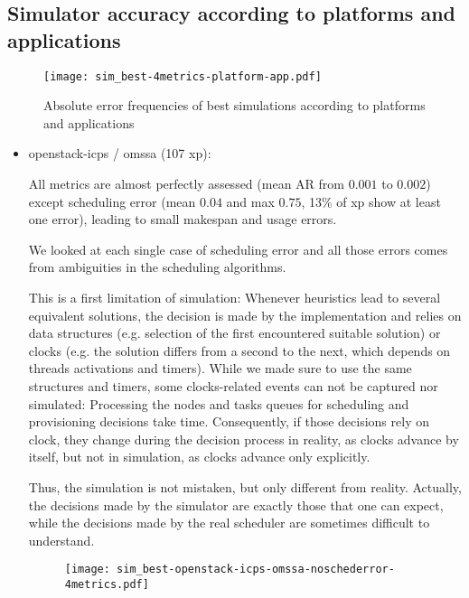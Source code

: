\subsection{Simulator accuracy according to platforms and applications}


\begin{figure}
  \texttt{[image: sim\_best-4metrics-platform-app.pdf]}
\caption{Absolute error frequencies of best simulations according to platforms 
and applications}
\end{figure} 

\begin{itemize}
 \item openstack-icps / omssa (107 xp): 
 
      
 
      All metrics are almost perfectly assessed (mean AR from $0.001$ to $0.002$)
      except scheduling error 
      (mean $0.04$ and max $0.75$, 13\% of xp show at least one error), 
      leading to small makespan and usage errors. 
      
      We looked at each single case of scheduling error and all those errors 
      comes from ambiguities in the scheduling algorithms.
      
      This is a first limitation of simulation:
      Whenever heuristics lead to several equivalent solutions, 
      the decision is made by the implementation and relies on data structures 
      (e.g. selection of the first encountered suitable solution) or clocks 
      (e.g. the solution differs from a second to the next, which depends 
      on threads activations and timers). While we made sure to use the same 
      structures and timers, some clocks-related events can not be captured nor 
      simulated: Processing the nodes and tasks queues for scheduling and 
      provisioning decisions take time. Consequently, if those decisions rely on
      clock, they change during the decision process in reality, as clocks advance 
      by itself, but not in simulation, as clocks advance only explicitly.
      
      Thus, the simulation is not mistaken, but only different from reality.
      Actually, the decisions made by the simulator are exactly those that one 
      can expect, while the decisions made by the real scheduler are sometimes
      difficult to understand.

      
\begin{figure}  
  \texttt{[image: sim\_best-openstack-icps-omssa-noschederror-4metrics.pdf]}


\end{figure}
\end{itemize}
